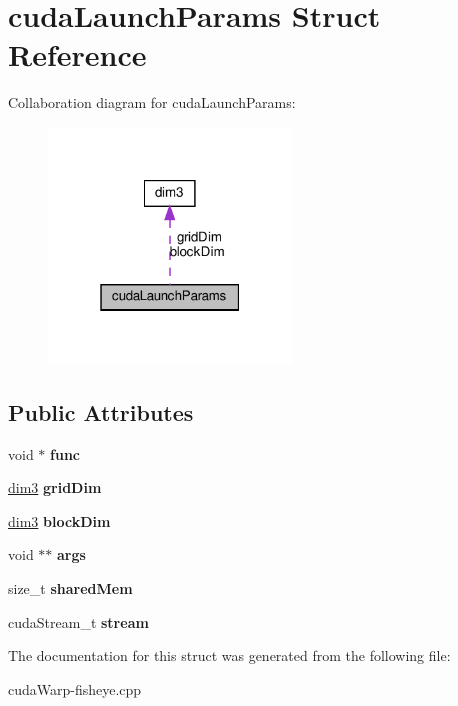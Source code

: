 \hypertarget{structcudaLaunchParams}{}\section{cuda\+Launch\+Params Struct Reference}
\label{structcudaLaunchParams}


Collaboration diagram for cuda\+Launch\+Params\+:\nopagebreak
\begin{figure}[H]
\begin{center}
\leavevmode
\includegraphics[width=183pt]{structcudaLaunchParams__coll__graph}
\end{center}
\end{figure}
\subsection*{Public Attributes}
\begin{DoxyCompactItemize}
\item 
void $\ast$ {\bfseries func}\hypertarget{structcudaLaunchParams_ab83c5ba1757e15e87386300690c9b081}{}\label{structcudaLaunchParams_ab83c5ba1757e15e87386300690c9b081}

\item 
\hyperlink{structdim3}{dim3} {\bfseries grid\+Dim}\hypertarget{structcudaLaunchParams_aad6b5e617a8c137476babb2ca1b94570}{}\label{structcudaLaunchParams_aad6b5e617a8c137476babb2ca1b94570}

\item 
\hyperlink{structdim3}{dim3} {\bfseries block\+Dim}\hypertarget{structcudaLaunchParams_add319c6a16b02bdcce0c08fb3e03b87f}{}\label{structcudaLaunchParams_add319c6a16b02bdcce0c08fb3e03b87f}

\item 
void $\ast$$\ast$ {\bfseries args}\hypertarget{structcudaLaunchParams_a5fbd7dbed62b8cd76d00a5396994f03d}{}\label{structcudaLaunchParams_a5fbd7dbed62b8cd76d00a5396994f03d}

\item 
size\+\_\+t {\bfseries shared\+Mem}\hypertarget{structcudaLaunchParams_a86f6dff594ff6d496509a9f3c6607f17}{}\label{structcudaLaunchParams_a86f6dff594ff6d496509a9f3c6607f17}

\item 
cuda\+Stream\+\_\+t {\bfseries stream}\hypertarget{structcudaLaunchParams_a1f780f7a1266c1d820d46b31d025bd0c}{}\label{structcudaLaunchParams_a1f780f7a1266c1d820d46b31d025bd0c}

\end{DoxyCompactItemize}


The documentation for this struct was generated from the following file\+:\begin{DoxyCompactItemize}
\item 
cuda\+Warp-\/fisheye.\+cpp\end{DoxyCompactItemize}
